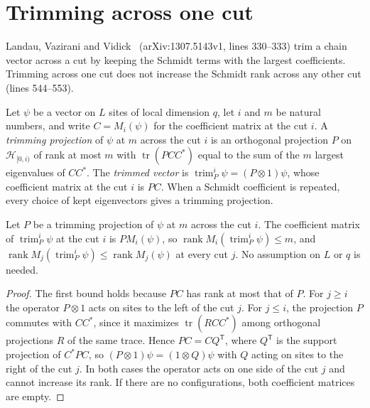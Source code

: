 \section{Trimming across one cut}

Landau, Vazirani and Vidick~\cite{Landau2015Polynomial} (arXiv:1307.5143v1,
lines 330--333) trim a chain vector across a cut by keeping the Schmidt terms
with the largest coefficients. Trimming across one cut does not increase the
Schmidt rank across any other cut (lines 544--553).

\begin{definition}
    \label{def:chain_trim}
    \leanok
    Let $\psi$ be a vector on $L$ sites of local dimension $q$, let $i$ and
    $m$ be natural numbers, and write $C=M_i(\psi)$ for the coefficient matrix
    at the cut $i$. A \emph{trimming projection} of $\psi$ at $m$ across the
    cut $i$ is an orthogonal projection $P$ on $\mathcal H_{[0,i)}$ of rank at
    most $m$ with $\operatorname{tr}(PCC^{*})$ equal to the sum of the $m$
    largest eigenvalues of $CC^{*}$. The \emph{trimmed vector} is
    $\operatorname{trim}^i_P\psi=(P\otimes1)\psi$, whose coefficient matrix
    at the cut $i$ is $PC$. When a Schmidt coefficient is repeated, every
    choice of kept eigenvectors gives a trimming projection.
\end{definition}

\begin{lemma}
    \label{thm:chain_trim_cut_ranks}
    \leanok
    Let $P$ be a trimming projection of $\psi$ at $m$ across the cut $i$.
    The coefficient matrix of $\operatorname{trim}^i_P\psi$ at the cut $i$ is
    $PM_i(\psi)$, so $\operatorname{rank}M_i(\operatorname{trim}^i_P\psi)\le m$, and
    $\operatorname{rank}M_j(\operatorname{trim}^i_P\psi)\le
        \operatorname{rank}M_j(\psi)$ at every cut $j$. No assumption on $L$
    or $q$ is needed.
\end{lemma}
\begin{proof}\leanok
    The first bound holds because $PC$ has rank at most that of $P$. For
    $j\ge i$ the operator $P\otimes1$ acts on sites to the left of the cut
    $j$. For $j\le i$, the projection $P$ commutes with $CC^{*}$, since it
    maximizes $\operatorname{tr}(RCC^{*})$ among orthogonal projections $R$
    of the same trace. Hence $PC=CQ^{\mathsf T}$, where $Q^{\mathsf T}$ is the
    support projection of $C^{*}PC$, so $(P\otimes1)\psi=(1\otimes Q)\psi$
    with $Q$ acting on sites to the right of the cut $j$. In both cases the
    operator acts on one side of the cut $j$ and cannot increase its rank.
    If there are no configurations, both coefficient matrices are empty.
\end{proof}

